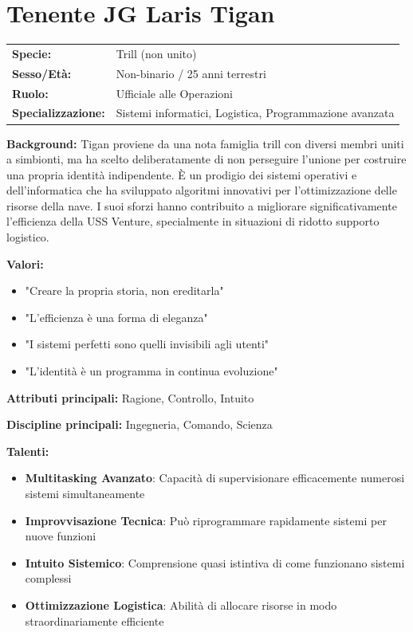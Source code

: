 \documentclass[11pt,a4paper]{article}
\begin{document}
\section{Tenente JG Laris Tigan}

\begin{tcolorbox}[colback=fedlightblue!10, colframe=fedblue]
\begin{tabularx}{\textwidth}{lX}
\textbf{Specie:} & Trill (non unito) \\
\textbf{Sesso/Età:} & Non-binario / 25 anni terrestri \\
\textbf{Ruolo:} & Ufficiale alle Operazioni \\
\textbf{Specializzazione:} & Sistemi informatici, Logistica, Programmazione avanzata \\
\end{tabularx}

\textbf{Background:} Tigan proviene da una nota famiglia trill con diversi membri uniti a simbionti, ma ha scelto deliberatamente di non perseguire l'unione per costruire una propria identità indipendente. È un prodigio dei sistemi operativi e dell'informatica che ha sviluppato algoritmi innovativi per l'ottimizzazione delle risorse della nave. I suoi sforzi hanno contribuito a migliorare significativamente l'efficienza della USS Venture, specialmente in situazioni di ridotto supporto logistico.

\textbf{Valori:}
\begin{itemize}[leftmargin=*]
\item "Creare la propria storia, non ereditarla"
\item "L'efficienza è una forma di eleganza"
\item "I sistemi perfetti sono quelli invisibili agli utenti"
\item "L'identità è un programma in continua evoluzione"
\end{itemize}

\textbf{Attributi principali:} Ragione, Controllo, Intuito

\textbf{Discipline principali:} Ingegneria, Comando, Scienza

\textbf{Talenti:}
\begin{itemize}[leftmargin=*]
\item \textbf{Multitasking Avanzato}: Capacità di supervisionare efficacemente numerosi sistemi simultaneamente
\item \textbf{Improvvisazione Tecnica}: Può riprogrammare rapidamente sistemi per nuove funzioni
\item \textbf{Intuito Sistemico}: Comprensione quasi istintiva di come funzionano sistemi complessi
\item \textbf{Ottimizzazione Logistica}: Abilità di allocare risorse in modo straordinariamente efficiente
\end{itemize}
\end{tcolorbox}
\end{document}
